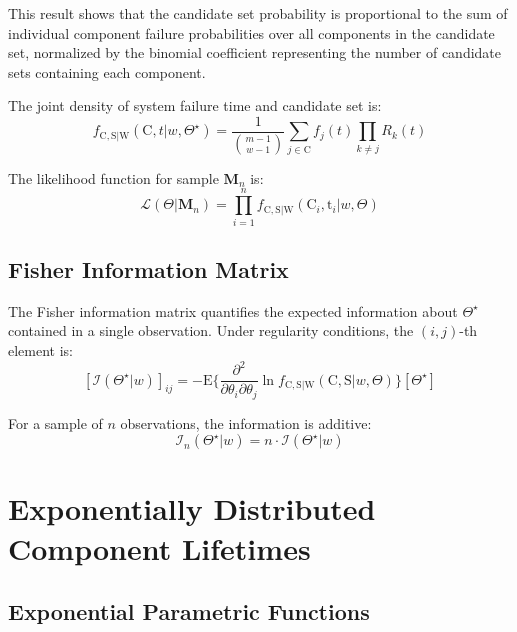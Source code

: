 \documentclass[12pt]{article}
\newcommand{\RV}[1]{\mathrm{#1}}
\newcommand{\Expect}[1]{\mathrm{E}\{#1\}}
\newcommand{\sv}{\RV{S}}           %
\newcommand{\cand}{\RV{C}}         %
\newcommand{\rvcand}{\RV{C}}       %
\newcommand{\ti}{\mathrm{t}}       %
\newcommand{\sysparam}{\Theta}
\newcommand{\tparam}[1]{{#1}^{\star}}  %
\newcommand{\infomatrx}{\mathcal{I}}
\newcommand{\likelihood}{\mathcal{L}}
\newcommand{\mfs}{\mathbf{M}_n}
\newcommand{\pdf}{f}
\newcommand{\srv}{R}
\theoremstyle{definition}
\theoremstyle{remark}
\begin{document}
This result shows that the candidate set probability is proportional to the sum of individual component failure probabilities over all components in the candidate set, normalized by the binomial coefficient representing the number of candidate sets containing each component.

The joint density of system failure time and candidate set is:
\begin{equation}
\label{eq:joint_density}
\pdf_{\rvcand, \sv | \RV{W}}(\cand, t | w, \tparam{\sysparam}) = \frac{1}{\binom{m-1}{w-1}} \sum_{j \in \cand} \pdf_j(t) \prod_{k \neq j} \srv_k(t)
\end{equation}

The likelihood function for sample $\mfs$ is:
\begin{equation}
\label{eq:likelihood}
\likelihood(\sysparam | \mfs) = \prod_{i=1}^{n} \pdf_{\rvcand, \sv | \RV{W}}(\cand_i, \ti_i | w, \sysparam)
\end{equation}

\subsection{Fisher Information Matrix}

The Fisher information matrix quantifies the expected information about $\tparam{\sysparam}$ contained in a single observation. Under regularity conditions, the $(i,j)$-th element is:
\begin{equation}
\label{eq:fisher_info_element}
[\infomatrx(\tparam{\sysparam} | w)]_{ij} = -\Expect{\frac{\partial^2}{\partial \theta_i \partial \theta_j} \ln \pdf_{\rvcand, \sv | \RV{W}}(\rvcand, \sv | w, \sysparam)}[\tparam{\sysparam}]
\end{equation}

For a sample of $n$ observations, the information is additive:
\begin{equation}
\infomatrx_n(\tparam{\sysparam} | w) = n \cdot \infomatrx(\tparam{\sysparam} | w)
\end{equation}

\section{Exponentially Distributed Component Lifetimes}
\label{sec:exponential}

\subsection{Exponential Parametric Functions}
\end{document}

